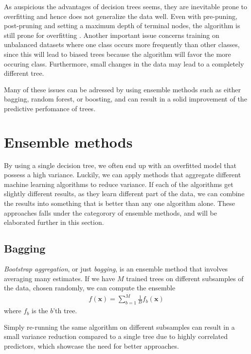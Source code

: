 As auspicious the advantages of decision trees seems, they are inevitable prone to overfitting and hence does not generalize the data well. Even with pre-puning, post-pruning and setting a maximum depth of terminal nodes, the algorithm is still prone for overfitting \cite{Guido2016}. Another important issue concerns training on unbalanced datasets where one class occurs more frequently than other classes, since this will lead to biased trees because the algorithm will favor the more occuring class. Furthermore, small changes in the data may lead to a completely different tree.

Many of these issues can be adressed by using ensemble methods such as either bagging, random forest, or boosting, and can result in a solid improvement of the predictive perfomance of trees.

\section{Ensemble methods}

By using a single decision tree, we often end up with an overfitted model that possess a high variance. Luckily, we can apply methods that aggregate different machine learning algorithms to reduce variance. If each of the algorithms get slightly different results, as they learn different part of the data, we can combine the results into something that is better than any one algorithm alone. These approaches falls under the categorory of ensemble methods, and will be elaborated further in this section. %

\subsection{Bagging}

\textit{Bootstrap aggregation}, or just \textit{bagging}, is an ensemble method that involves averaging many estimates. If we have $M$ trained trees on different subsamples of the data, chosen randomly, we can compute the ensemble
\begin{align}
  f(\textbf{x}) = \sum_{b=1}^M \frac{1}{B}f_b(\textbf{x})
\end{align}
where $f_b$ is the $b$'th tree.

Simply re-running the same algorithm on different subsamples can result in a small variance reduction compared to a single tree due to highly correlated predictors, which showcase the need for better approaches.

